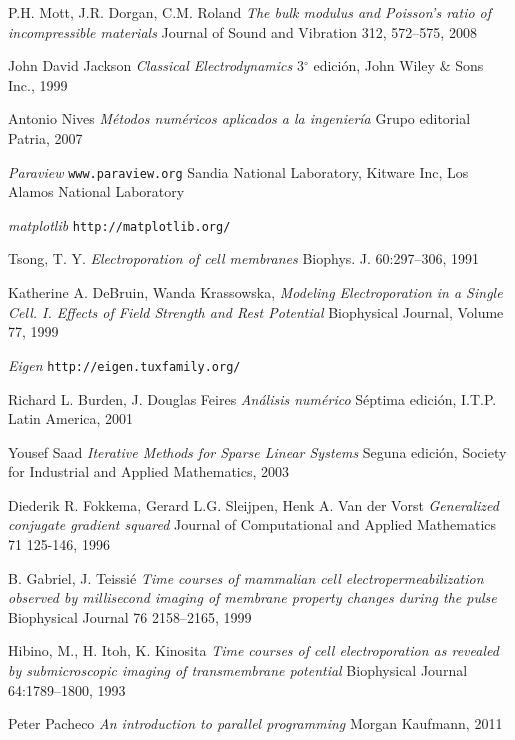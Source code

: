 \begin{thebibliography}{99}
	P.H. Mott, J.R. Dorgan, C.M. Roland 
	\emph{The bulk modulus and Poisson's ratio of incompressible materials} 
	Journal of Sound and Vibration 312, 572–575, 2008
	
	John David Jackson
	\emph{Classical Electrodynamics}
	3$^{\circ}$ edición,
	John Wiley \& Sons Inc.,
	1999

	Antonio Nives
	\emph{Métodos numéricos aplicados a la ingeniería}
	Grupo editorial Patria,
	2007

	\emph{Paraview}
	\texttt{www.paraview.org}
	Sandia National Laboratory, Kitware Inc, Los Alamos National Laboratory

	\emph{matplotlib}
	\texttt{http://matplotlib.org/}

	Tsong, T. Y.
	\emph{Electroporation of cell membranes}
	Biophys. J. 60:297–306, 1991

	Katherine A. DeBruin, Wanda Krassowska, 
	\emph{Modeling Electroporation in a Single Cell. I. Effects of Field Strength and
Rest Potential}
	Biophysical Journal, Volume 77, 1999
	
	\emph{Eigen}
	\texttt{http://eigen.tuxfamily.org/}
	
	Richard L. Burden, J. Douglas Feires
	\emph{Análisis numérico}
	Séptima edición, I.T.P. Latin America, 2001

	Yousef Saad
	\emph{Iterative Methods for Sparse Linear Systems}
	Seguna edición, Society for Industrial and Applied Mathematics, 2003

    Diederik R. Fokkema, Gerard L.G. Sleijpen, Henk A. Van der Vorst
    \emph{Generalized conjugate gradient squared}
    Journal of Computational and Applied Mathematics 71 125-146, 1996

    B. Gabriel, J. Teissié
    \emph{Time courses of mammalian cell electropermeabilization observed by millisecond imaging of membrane property changes during the pulse}
    Biophysical Journal 76 2158–2165, 1999

    Hibino, M., H. Itoh, K. Kinosita
    \emph{Time courses of cell electroporation as revealed by submicroscopic imaging of transmembrane potential}
    Biophysical Journal 64:1789–1800, 1993

	Peter Pacheco
	\emph{An introduction to parallel programming}
	Morgan Kaufmann, 2011

\end{thebibliography}
